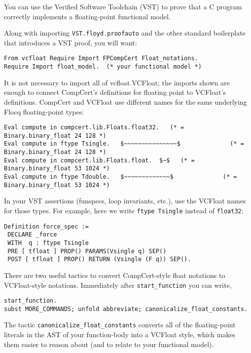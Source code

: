 \documentclass[article]{memoir}
\begin{document}
You can use the Verified Software Toolchain (VST) to prove that a C program
correctly implements a floating-point functional model.

Along with importing \lstinline{VST.floyd.proofauto} and
the other standard boilerplate that introduces a VST proof,
you will want:

\begin{lstlisting}
From vcfloat Require Import FPCompCert Float_notations.
Require Import float_model.  (* your functional model *)
\end{lstlisting}

It is not necessary to import all of vcfloat.VCFloat; the imports shown
are enough to connect CompCert's definitions for floating point
to VCFloat's definitions.  CompCert and VCFloat use different names
for the same underlying Flocq floating-point types:

\begin{lstlisting}
Eval compute in compcert.lib.Floats.float32.   (* = Binary.binary_float 24 128 *)
Eval compute in ftype Tsingle.   $~~~~~~~~~~~~~~~$              (* = Binary.binary_float 24 128 *)
Eval compute in compcert.lib.Floats.float.  $~$   (* = Binary.binary_float 53 1024 *)
Eval compute in ftype Tdouble.   $~~~~~~~~~~~~~$              (* = Binary.binary_float 53 1024 *)
\end{lstlisting}

In your VST assertions (funspecs, loop invariants,
etc.), use the VCFloat names for those types.
For example, here we write \lstinline{ftype Tsingle} instead of
\lstinline{float32}:

\begin{lstlisting}
Definition force_spec :=
 DECLARE _force
 WITH  q : ftype Tsingle
 PRE [ tfloat ] PROP() PARAMS(Vsingle q) SEP()
 POST [ tfloat ] PROP() RETURN (Vsingle (F q)) SEP().
\end{lstlisting}

There are two useful tactics to convert CompCert-style float notations to VCFloat-style notations.  Immediately after \lstinline{start_function} you
can write,

\begin{lstlisting}
start_function.
subst MORE_COMMANDS; unfold abbreviate; canonicalize_float_constants.
\end{lstlisting}

The tactic \lstinline{canonicalize_float_constants} converts
all of the floating-point literals in the AST of your function-body
into a VCFloat style, which makes them easier to reason about
(and to relate to your functional model).
\end{document}
